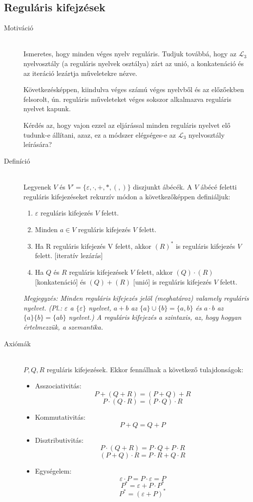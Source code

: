 \documentclass[margin=0px]{article}
\begin{document}
		\subsection{Reguláris kifejzések}
			\begin{description}
				\item[Motiváció] \hfill \\
					Ismeretes, hogy minden véges nyelv reguláris. Tudjuk továbbá, hogy az $\mathcal{L}_3$ nyelvosztály (a reguláris nyelvek osztálya) zárt az unió, a konkatenáció és az iteráció lezártja műveletekre nézve.
				
					Következésképpen, kiindulva véges számú véges nyelvből és az előzőekben felsorolt, ún. reguláris műveleteket véges sokszor alkalmazva reguláris nyelvet kapunk.
					
					Kérdés az, hogy vajon ezzel az eljárással minden reguláris nyelvet
					elő tudunk-e állítani, azaz, ez a módszer elégséges-e az $\mathcal{L}_3$ nyelvosztály leírására?
				\item[Definíció] \hfill \\
					Legyenek $V$ és $V' = \{\varepsilon, \cdot, +, *, (, )\}$ diszjunkt ábécék. A $V$ ábécé feletti reguláris kifejezéseket rekurzív módon a következőképpen definiáljuk:
					\begin{enumerate}
						\item $\varepsilon$ reguláris kifejezés $V$ felett.
						\item Minden $a \in V$ reguláris kifejezés $V$ felett.
						\item Ha R reguláris kifejezés V felett, akkor $(R)^*$ is reguláris kifejezés $V$ felett. [iteratív lezárás]
						\item Ha $Q$ és $R$ reguláris kifejezések $V$ felett, akkor $(Q) \cdot (R)$ [konkatenáció] és $(Q) + (R)$ [unió] is reguláris kifejezés $V$ felett.
					\end{enumerate}
					
					\textit{Megjegyzés: Minden reguláris kifejezés jelöl (meghatároz) valamely reguláris nyelvet. (Pl.: $\varepsilon$ a $\{\varepsilon\}$ nyelvet, $a+b$ az $\{a\} \cup \{b\} = \{a,b\}$ és $a\cdot b$ az $\{a\}\{b\} = \{ab\}$ nyelvet.) A reguláris kifejezés a szintaxis, az, hogy hogyan értelmezzük, a szemantika.}
				\item[Axiómák]\hfill \\
					$P,Q,R$ reguláris kifejezések. Ekkor fennállnak a következő tulajdonságok:
					\begin{itemize}
						\item Asszociativitás:
							\[P+(Q+R) = (P+Q)+R\]
							\[P\cdot(Q\cdot R) = (P\cdot Q)\cdot R\]
						\item Kommutativitás:
							\[P+Q = Q+P\]
						\item Disztributivitás:
							\[P\cdot (Q+R) = P\cdot Q + P\cdot R\]
							\[(P+Q)\cdot R = P\cdot R + Q\cdot R\]
						 \item Egységelem:
							 \[\varepsilon\cdot P = P\cdot\varepsilon = P\]
							 \[P^* = \varepsilon + P \cdot P^*\]
							 \[P^* = (\varepsilon+P)^*\]
					\end{itemize}
					

\end{description}
\end{document}
